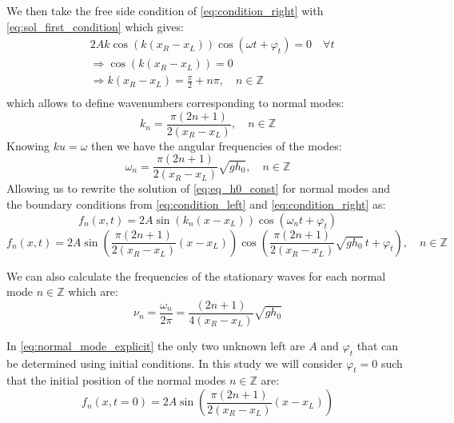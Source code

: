 We then take the free side condition of \autoref{eq:condition_right} with \autoref{eq:sol_first_condition} which gives:
\[
    \begin{aligned}
        & 2A k \cos(k(x_R-x_L))\cos(\omega t + \varphi_t) = 0 \quad \forall t \\
        & \Rightarrow \cos(k(x_R-x_L)) = 0 \\
        & \Rightarrow k(x_R-x_L) = \frac{\pi}{2} + n\pi, \quad n \in \mathbb{Z} \\
    \end{aligned}
\]
which allows to define wavenumbers corresponding to normal modes:
\begin{equation}
    k_n = \frac{\pi(2n + 1)}{2(x_R-x_L)}, \quad n \in \mathbb{Z}
    \label{eq:wavenumber_mode}
\end{equation}
Knowing $ku = \omega$ then we have the angular frequencies of the modes:
\begin{equation}
    \omega_n = \frac{\pi(2n + 1)}{2(x_R-x_L)} \sqrt{gh_0}, \quad n \in \mathbb{Z}
    \label{eq:angular_mode}
\end{equation}
Allowing us to rewrite the solution of \autoref{eq:eq_h0_const} for normal modes and the boundary conditions from \autoref{eq:condition_left} and \autoref{eq:condition_right} as:
\begin{equation}
    f_n(x,t) = 2A\sin(k_n(x - x_L))\cos(\omega_n t + \varphi_t)
    \label{eq:normal_mode_simple}
\end{equation}
\begin{equation}
    f_n(x,t) = 2A\sin\left(\frac{\pi(2n + 1)}{2(x_R-x_L)}(x - x_L)\right)\cos\left(\frac{\pi(2n + 1)}{2(x_R-x_L)} \sqrt{gh_0} \, t + \varphi_t\right), \quad n \in \mathbb{Z}
    \label{eq:normal_mode_explicit}
\end{equation}

We can also calculate the frequencies of the stationary waves for each normal mode $n \in \mathbb{Z}$ which are:
\begin{equation}
    \nu_n = \frac{\omega_n}{2\pi} = \frac{(2n + 1)}{4(x_R-x_L)} \sqrt{gh_0}
    \label{eq:normal_frequency}
\end{equation}

In \autoref{eq:normal_mode_explicit} the only two unknown left are $A$ and $\varphi_t$ that can be determined using initial conditions. In this study we will consider $\varphi_t = 0$ such that the initial position of the normal modes $n \in \mathbb{Z}$ are:
\begin{equation}
    f_n(x,t=0) = 2A\sin\left(\frac{\pi(2n + 1)}{2(x_R-x_L)}(x - x_L)\right)
    \label{eq:normal_initial}
\end{equation}


